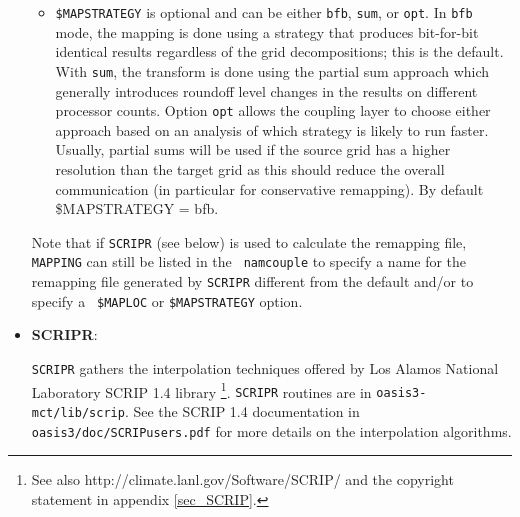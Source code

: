\begin{itemize}
\begin{itemize}
  \item {\tt \$MAPSTRATEGY} is optional and can be either {\tt bfb},
    {\tt sum}, or {\tt opt}.  In {\tt bfb} mode, the mapping is done
    using a strategy that produces bit-for-bit identical results
    regardless of the grid decompositions; this is the default.  With {\tt sum}, the
    transform is done using the partial sum approach which generally
    introduces roundoff level changes in the results on different
    processor counts. Option {\tt opt} allows the coupling layer to
    choose either approach based on an analysis of which strategy is
    likely to run faster. Usually, partial sums will be used if the
    source grid has a higher resolution than the target grid as this
    should reduce the overall communication (in particular for conservative
    remapping). By default \$MAPSTRATEGY = bfb.

  \end{itemize}

  Note that if {\tt SCRIPR} (see below) is used to calculate the
  remapping file, {\tt MAPPING} can still be listed in the {\tt
    namcouple} to specify a name for the remapping file generated by
  {\tt SCRIPR} different from the default and/or to specify a {\tt
    \$MAPLOC} or {\tt \$MAPSTRATEGY} option.

\item {\bf SCRIPR}:
 
  {\tt SCRIPR} gathers the interpolation techniques offered by Los
  Alamos National Laboratory SCRIP 1.4 library
  \citep{Jones99}\footnote{See also
    http://climate.lanl.gov/Software/SCRIP/ and the copyright
    statement in appendix \ref{sec_SCRIP}.}.  {\tt SCRIPR} routines
  are in {\tt oasis3-mct/lib/scrip}. See the SCRIP 1.4 documentation
  in {\tt oasis3/doc/SCRIPusers.pdf} for more details on the
  interpolation algorithms.
  

\end{itemize}
